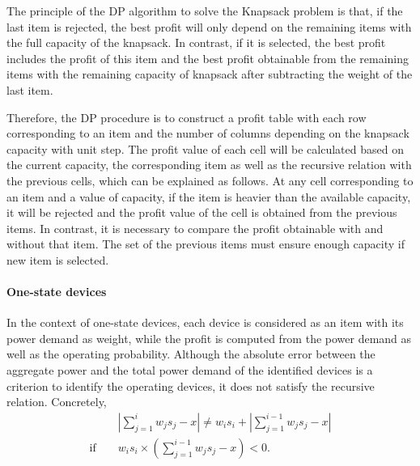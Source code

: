 The principle of the DP algorithm to solve the Knapsack problem is that, if the last item is rejected, the best profit will only depend on the remaining items with the full capacity of the knapsack. In contrast, if it is selected, the best profit includes the profit of this item and the best profit obtainable from the remaining items with the remaining capacity of knapsack after subtracting the weight of the last item. 

Therefore, the DP procedure is to construct a profit table with each row corresponding to an item and the number of columns depending on the knapsack capacity with unit step. The profit value of each cell will be calculated based on the current capacity, the corresponding item as well as the recursive relation with the previous cells, which can be explained as follows. At any cell corresponding to an item and a value of capacity, if the item is heavier than the available capacity, it will be rejected and the profit value of the cell is obtained from the previous items. In contrast, it is necessary to compare the profit obtainable with and without that item. The set of the previous items must ensure enough capacity if new item is selected.

\paragraph*{One-state devices}
In the context of one-state devices, each device is considered as an item with its power demand as weight, while the profit is computed from the power demand as well as the operating probability. Although the absolute error between the aggregate power and the total power demand of the identified devices is a criterion to identify the operating devices, it does not satisfy the recursive relation. Concretely,
\begin{eqnarray}
&&\left |\sum_{j=1}^i{w_js_j-x}\right | \neq w_is_i +\left |\sum_{j=1}^{i-1}{w_js_j}-x\right |\\
\mbox{if } &&w_is_i \times \left (\sum_{j=1}^{i-1}{w_js_j}-x\right )<0.\nonumber
\end{eqnarray}

